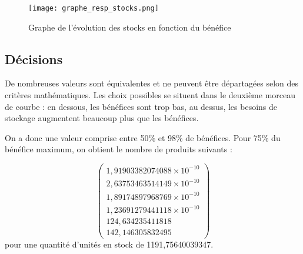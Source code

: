 \begin{figure}[h!]
	\texttt{[image: graphe\_resp\_stocks.png]}
	\caption{Graphe de l'évolution des stocks en fonction du bénéfice}
\end{figure}


\subsection{Décisions}
De nombreuses valeurs sont équivalentes et ne peuvent être départagées selon des
critères mathématiques. Les choix possibles se situent dans le deuxième morceau
de courbe : en dessous, les bénéfices sont trop bas, au dessus, les besoins de
stockage augmentent beaucoup plus que les bénéfices.

On a donc une valeur comprise entre 50\% et 98\% de bénéfices. Pour 75\% du
bénéfice maximum, on obtient le nombre de produits suivants :

\begin{equation}
\begin{pmatrix}
1,91903382074088 \times 10^{-10} \\
2,63753463514149 \times 10^{-10} \\ 
1,89174897968769 \times 10^{-10} \\
1,23691279441118 \times 10^{-10} \\ 
124,634235411818 \\
142,146305832495 
\end{pmatrix}
\end{equation}
pour une quantité d'unités en stock de 1191,75640039347.



